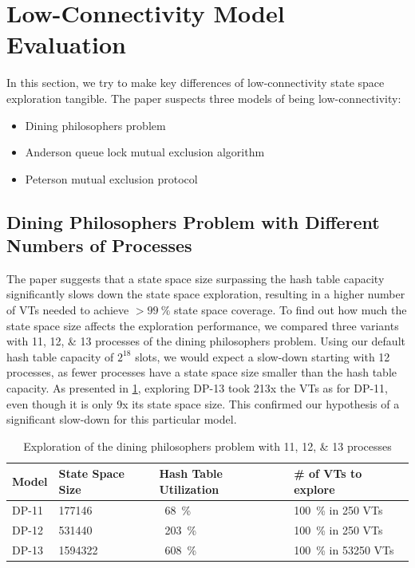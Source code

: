 \documentclass[
fancyheadings, %
%
%
]{stsreprt}
\begin{document}

\section{Low-Connectivity Model Evaluation}
\label{section:evaluation:low-connectivity-model-evaluation}

In this section, we try to make key differences of low-connectivity state space exploration tangible.
The paper suspects three models of being low-connectivity:

\begin{itemize}
    \item Dining philosophers problem
    \item Anderson queue lock mutual exclusion algorithm
    \item Peterson mutual exclusion protocol
\end{itemize}

\subsection{Dining Philosophers Problem with Different Numbers of Processes}

The paper suggests that a state space size surpassing the hash table capacity significantly slows down the state space exploration, resulting in a higher number of VTs needed to achieve $>\SI{99}{\percent}$ state space coverage.
To find out how much the state space size affects the exploration performance, we compared three variants with \numlist{11;12;13} processes of the dining philosophers problem.
Using our default hash table capacity of $2^{18}$ slots, we would expect a slow-down starting with 12 processes, as fewer processes have a state space size smaller than the hash table capacity.
As presented in \cref{table:EXP-10}, exploring DP-13 took 213x the VTs as for DP-11, even though it is only 9x its state space size.
This confirmed our hypothesis of a significant slow-down for this particular model.

\begin{table}
    \caption{Exploration of the dining philosophers problem with \numlist{11;12;13} processes}
    \label{table:EXP-10}
    \centering
    \begin{tabular}{l l l l}
        \toprule
        Model & State Space Size & Hash Table Utilization & \# of VTs to explore                  \\
        \midrule
        DP-11 & \num{177146}     & ~\SI{68}{\percent}     & \SI{100}{\percent} in 250 VTs         \\
        DP-12 & \num{531440}     & ~\SI{203}{\percent}    & \SI{100}{\percent} in 250 VTs         \\
        DP-13 & \num{1594322}    & ~\SI{608}{\percent}    & \SI{100}{\percent} in \num{53250} VTs \\
        \bottomrule
    \end{tabular}
\end{table}
\end{document}
